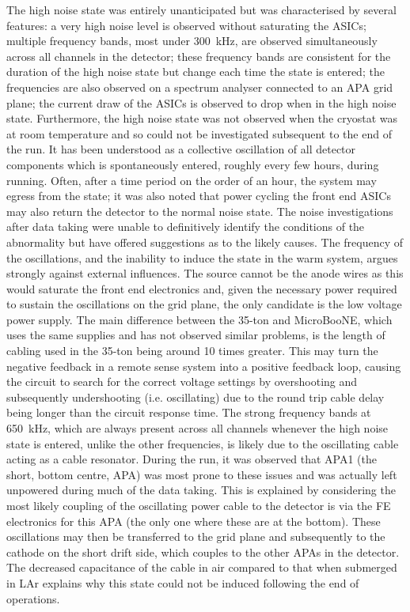The high noise state was entirely unanticipated but was characterised by several features: a very high noise level is observed without saturating the ASICs; multiple frequency bands, most under 300~kHz, are observed simultaneously across all channels in the detector; these frequency bands are consistent for the duration of the high noise state but change each time the state is entered; the frequencies are also observed on a spectrum analyser connected to an APA grid plane; the current draw of the ASICs is observed to drop when in the high noise state.  Furthermore, the high noise state was not observed when the cryostat was at room temperature and so could not be investigated subsequent to the end of the run.  It has been understood as a collective oscillation of all detector components which is spontaneously entered, roughly every few hours, during running.  Often, after a time period on the order of an hour, the system may egress from the state; it was also noted that power cycling the front end ASICs may also return the detector to the normal noise state.  The noise investigations after data taking were unable to definitively identify the conditions of the abnormality but have offered suggestions as to the likely causes.  The frequency of the oscillations, and the inability to induce the state in the warm system, argues strongly against external influences.  The source cannot be the anode wires as this would saturate the front end electronics and, given the necessary power required to sustain the oscillations on the grid plane, the only candidate is the low voltage power supply.  The main difference between the 35-ton and MicroBooNE, which uses the same supplies and has not observed similar problems, is the length of cabling used in the 35-ton being around 10 times greater.  This may turn the negative feedback in a remote sense system into a positive feedback loop, causing the circuit to search for the correct voltage settings by overshooting and subsequently undershooting (i.e. oscillating) due to the round trip cable delay being longer than the circuit response time.  The strong frequency bands at 650~kHz, which are always present across all channels whenever the high noise state is entered, unlike the other frequencies, is likely due to the oscillating cable acting as a cable resonator.  During the run, it was observed that APA1 (the short, bottom centre, APA) was most prone to these issues and was actually left unpowered during much of the data taking.  This is explained by considering the most likely coupling of the oscillating power cable  to the detector is via the FE electronics for this APA (the only one where these are at the bottom).  These oscillations may then be transferred to the grid plane and subsequently to the cathode on the short drift side, which couples to the other APAs in the detector.  The decreased capacitance of the cable in air compared to that when submerged in LAr explains why this state could not be induced following the end of operations.

